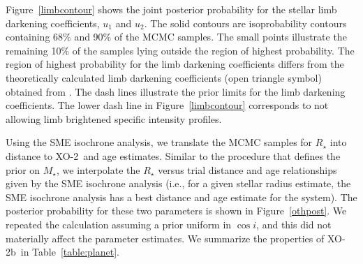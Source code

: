 \documentclass{emulateapj}
\newcommand{\xonb}{XO-2b}
\newcommand{\xon}{XO-2}
\begin{document}
Figure~\ref{limbcontour} shows the joint posterior probability for the
stellar limb darkening coefficients, $u_{1}$ and $u_{2}$.  The solid
contours are isoprobability contours containing 68\% and 90\% of the
MCMC samples.  The small points illustrate the remaining 10\% of the
samples lying outside the region of highest probability.  The region
of highest probability for the limb darkening coefficients differs
from the theoretically calculated limb darkening coefficients (open
triangle symbol) obtained from \citet{CLA00}.  The dash lines
illustrate the prior limits for the limb darkening coefficients.  The
lower dash line in Figure~\ref{limbcontour} corresponds to not
allowing limb brightened specific intensity profiles.

Using the SME isochrone analysis, we translate the MCMC samples for
$R_{\star}$ into distance to \xon\ and age estimates.  Similar to the
procedure that defines the prior on $M_{\star}$, we interpolate the
$R_{\star}$ versus trial distance and age relationships
given by the SME isochrone analysis (i.e., for a given stellar radius
estimate, the SME isochrone analysis has a best distance and age
estimate for the system).  The posterior probability for these two
parameters is shown in Figure~\ref{othpost}.  We repeated the
calculation assuming a prior uniform in $\cos{i}$, and this did not
materially affect the parameter estimates.    We
summarize the properties of \xonb\ in
Table~\ref{table:planet}.
\end{document}
